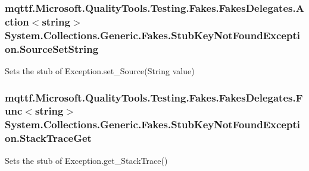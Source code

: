 \hypertarget{class_system_1_1_collections_1_1_generic_1_1_fakes_1_1_stub_key_not_found_exception_ac4bdf84cc2e006bbdf304bc85c2c8cee}{
\subsubsection[{Source\-Set\-String}]{\setlength{\rightskip}{0pt plus 5cm}mqttf.\-Microsoft.\-Quality\-Tools.\-Testing.\-Fakes.\-Fakes\-Delegates.\-Action$<$string$>$ System.\-Collections.\-Generic.\-Fakes.\-Stub\-Key\-Not\-Found\-Exception.\-Source\-Set\-String}}\label{class_system_1_1_collections_1_1_generic_1_1_fakes_1_1_stub_key_not_found_exception_ac4bdf84cc2e006bbdf304bc85c2c8cee}


Sets the stub of Exception.\-set\-\_\-\-Source(\-String value)

\hypertarget{class_system_1_1_collections_1_1_generic_1_1_fakes_1_1_stub_key_not_found_exception_a4103628b0a2221cfbb28e0243b33ea76}{
\subsubsection[{Stack\-Trace\-Get}]{\setlength{\rightskip}{0pt plus 5cm}mqttf.\-Microsoft.\-Quality\-Tools.\-Testing.\-Fakes.\-Fakes\-Delegates.\-Func$<$string$>$ System.\-Collections.\-Generic.\-Fakes.\-Stub\-Key\-Not\-Found\-Exception.\-Stack\-Trace\-Get}}\label{class_system_1_1_collections_1_1_generic_1_1_fakes_1_1_stub_key_not_found_exception_a4103628b0a2221cfbb28e0243b33ea76}


Sets the stub of Exception.\-get\-\_\-\-Stack\-Trace()


